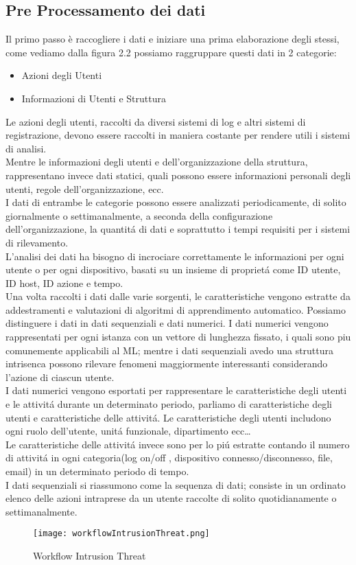 \documentclass[../tesi.tex]{subfiles}
\begin{document}
\subsection{Pre Processamento dei dati}
Il primo passo è raccogliere i dati e iniziare una prima elaborazione degli stessi, come vediamo dalla figura 2.2 possiamo raggruppare questi dati in 2 categorie: 
\begin{itemize}
\item Azioni degli Utenti
\item Informazioni di Utenti e Struttura
\end{itemize}
 Le azioni degli utenti, raccolti da diversi sistemi di log e altri sistemi di registrazione, devono essere raccolti in maniera costante per rendere utili i sistemi di analisi.\\
 Mentre le informazioni degli utenti e dell’organizzazione della struttura, rappresentano invece dati statici, quali possono essere informazioni personali degli utenti, regole dell’organizzazione, ecc.\\
I dati di entrambe le categorie possono essere analizzati periodicamente, di solito giornalmente o settimanalmente, a seconda della configurazione dell’organizzazione, la quantitá di dati e soprattutto i tempi requisiti per i sistemi di rilevamento.\\
L’analisi dei dati ha bisogno di incrociare correttamente le informazioni per ogni utente o per ogni dispositivo, basati su un insieme di proprietá come ID utente, ID host, ID azione e tempo.\\
Una volta raccolti i dati dalle varie sorgenti, le caratteristiche vengono estratte da addestramenti e valutazioni di algoritmi di apprendimento automatico.
Possiamo distinguere i dati in dati sequenziali e dati numerici. I dati numerici vengono rappresentati per ogni istanza con un vettore di lunghezza fissato, i quali sono piu comunemente applicabili al ML; mentre i dati sequenziali avedo una struttura intrisenca possono rilevare fenomeni maggiormente interessanti considerando l’azione di ciascun utente.\\
I dati numerici vengono esportati per rappresentare le caratteristiche degli utenti e le attivitá durante un determinato periodo, parliamo di caratteristiche degli utenti e caratteristiche delle attivitá.
Le caratteristiche degli utenti includono ogni ruolo dell’utente, unitá funzionale, dipartimento ecc…\\
Le caratteristiche delle attivitá invece sono per lo piú estratte contando il numero di attivitá in ogni categoria(log on/off , dispositivo connesso/disconnesso, file, email) in un determinato periodo di tempo.\\
I dati sequenziali si riassumono come la sequenza di dati;  consiste in un ordinato elenco delle azioni intraprese da un utente raccolte di solito quotidianamente o settimanalmente.\\
\begin{figure}[htbp]
\center
\texttt{[image: workflowIntrusionThreat.png]}
\caption{Workflow Intrusion Threat} 
\end{figure}
\newpage
\end{document}
